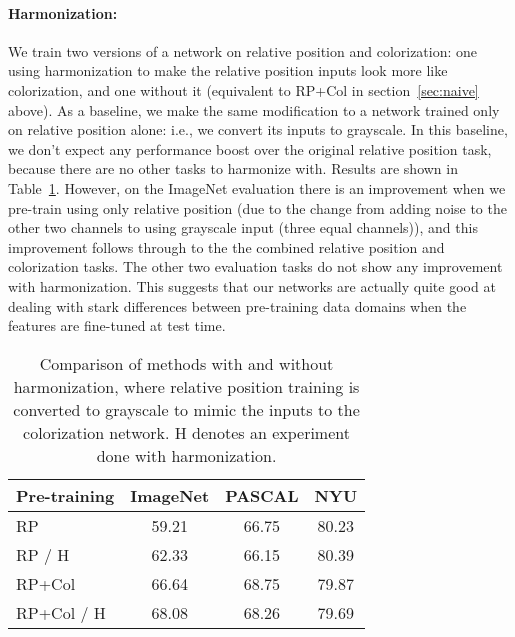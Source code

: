 \documentclass[10pt,twocolumn,letterpaper]{article}
\begin{document}
\paragraph{Harmonization:} We train two versions of a network on relative position and colorization: one using harmonization to make the relative position inputs look more like colorization, and one without it (equivalent to RP+Col in section~\ref{sec:naive} above).  
As a baseline, we make the same modification to a network trained only on relative position alone: i.e., we convert its inputs to grayscale.
In this baseline, we don't expect any performance boost over the original relative position task, because there are no other tasks to harmonize with.
Results are shown in Table~\ref{tab:harmonization_perf}.
However, on the ImageNet evaluation there is an improvement 
 when we
pre-train using only relative position (due to the change from adding noise to the other two channels
to using grayscale input (three equal channels)), and this improvement follows through to the
the combined relative position and colorization tasks.  The other two evaluation tasks do not show any
improvement with harmonization.
This suggests that our networks are actually quite good at dealing with stark differences between pre-training data domains when the features are fine-tuned at test time.

\begin{table}

\begin{center}
\begin{tabular}{l|c|c|c}
\hline
Pre-training & ImageNet & PASCAL & NYU\\
\hline\hline
RP & 59.21 & 66.75 & 80.23 \\
\hline

RP / H & 62.33 & 66.15 & 80.39\\
\hline
RP+Col & 66.64 & 68.75 &  79.87\\
\hline
RP+Col / H & 68.08 & 68.26 & 79.69\\
\hline
\end{tabular}
\end{center}


\caption{Comparison of methods with and without harmonization, where relative position training is converted to grayscale to mimic the inputs to the colorization network.  H denotes an experiment done with harmonization.  
}

\label{tab:harmonization_perf}
\end{table}
\end{document}
